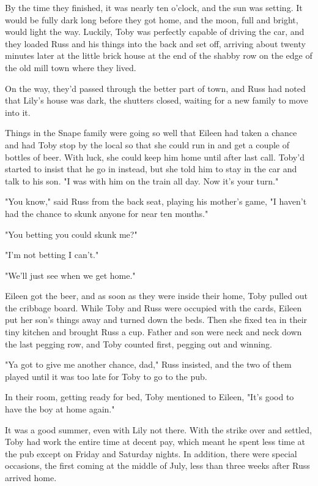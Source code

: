 \documentclass[a4paper,11pt]{article}
\begin{document}
By the time they finished, it was nearly ten o'clock, and the sun was setting. It would be fully dark long before they got home, and the moon, full and bright, would light the way. Luckily, Toby was perfectly capable of driving the car, and they loaded Russ and his things into the back and set off, arriving about twenty minutes later at the little brick house at the end of the shabby row on the edge of the old mill town where they lived.

On the way, they'd passed through the better part of town, and Russ had noted that Lily's house was dark, the shutters closed, waiting for a new family to move into it.

Things in the Snape family were going so well that Eileen had taken a chance and had Toby stop by the local so that she could run in and get a couple of bottles of beer. With luck, she could keep him home until after last call. Toby'd started to insist that he go in instead, but she told him to stay in the car and talk to his son. "I was with him on the train all day. Now it's your turn."

"You know," said Russ from the back seat, playing his mother's game, "I haven't had the chance to skunk anyone for near ten months."

"You betting you could skunk me?"

"I'm not betting I can't."

"We'll just see when we get home."

Eileen got the beer, and as soon as they were inside their home, Toby pulled out the cribbage board. While Toby and Russ were occupied with the cards, Eileen put her son's things away and turned down the beds. Then she fixed tea in their tiny kitchen and brought Russ a cup. Father and son were neck and neck down the last pegging row, and Toby counted first, pegging out and winning.

"Ya got to give me another chance, dad," Russ insisted, and the two of them played until it was too late for Toby to go to the pub.

In their room, getting ready for bed, Toby mentioned to Eileen, "It's good to have the boy at home again."

It was a good summer, even with Lily not there. With the strike over and settled, Toby had work the entire time at decent pay, which meant he spent less time at the pub except on Friday and Saturday nights. In addition, there were special occasions, the first coming at the middle of July, less than three weeks after Russ arrived home.
\end{document}
